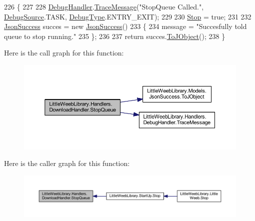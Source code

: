 \begin{DoxyCode}
226         \{
227 
228             \mbox{\hyperlink{class_little_weeb_library_1_1_handlers_1_1_download_handler_a9f1aedadbd6f343d8de1c54724eca11e}{DebugHandler}}.\mbox{\hyperlink{interface_little_weeb_library_1_1_handlers_1_1_i_debug_handler_a2e405bc3492e683cd3702fae125221bc}{TraceMessage}}(\textcolor{stringliteral}{"StopQueue Called."}, 
      \mbox{\hyperlink{namespace_little_weeb_library_1_1_handlers_a2a6ca0775121c9c503d58aa254d292be}{DebugSource}}.TASK, \mbox{\hyperlink{namespace_little_weeb_library_1_1_handlers_ab66019ed40462876ec4e61bb3ccb0a62}{DebugType}}.ENTRY\_EXIT);
229 
230             \mbox{\hyperlink{class_little_weeb_library_1_1_handlers_1_1_download_handler_af5e3cf628dab0016b460a3be80798609}{Stop}} = \textcolor{keyword}{true};
231 
232             \mbox{\hyperlink{class_little_weeb_library_1_1_models_1_1_json_success}{JsonSuccess}} succes = \textcolor{keyword}{new} \mbox{\hyperlink{class_little_weeb_library_1_1_models_1_1_json_success}{JsonSuccess}}()
233             \{
234                 message = \textcolor{stringliteral}{"Succesfully told queue to stop running."}
235             \};
236 
237             \textcolor{keywordflow}{return} succes.\mbox{\hyperlink{class_little_weeb_library_1_1_models_1_1_json_success_aa0e750a34606497266e5a4aedc03cdeb}{ToJObject}}();
238         \}
\end{DoxyCode}
Here is the call graph for this function\+:\nopagebreak
\begin{figure}[H]
\begin{center}
\leavevmode
\includegraphics[width=350pt]{class_little_weeb_library_1_1_handlers_1_1_download_handler_a8fd807f023ed25e031844da3927e1a23_cgraph}
\end{center}
\end{figure}
Here is the caller graph for this function\+:\nopagebreak
\begin{figure}[H]
\begin{center}
\leavevmode
\includegraphics[width=350pt]{class_little_weeb_library_1_1_handlers_1_1_download_handler_a8fd807f023ed25e031844da3927e1a23_icgraph}
\end{center}
\end{figure}

